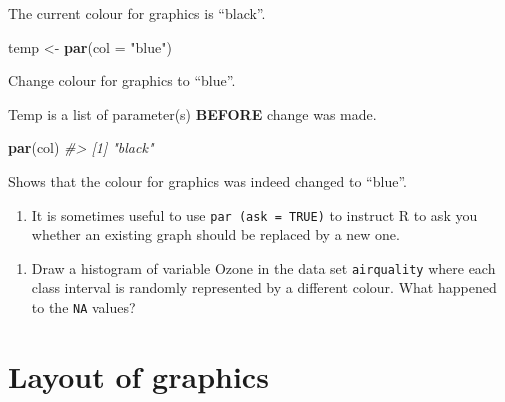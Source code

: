 \documentclass[
]{book}
\newenvironment{Shaded}{\begin{snugshade}}{\end{snugshade}}
\newcommand{\AttributeTok}[1]{\textcolor[rgb]{0.13,0.29,0.53}{#1}}
\newcommand{\CommentTok}[1]{\textcolor[rgb]{0.56,0.35,0.01}{\textit{#1}}}
\newcommand{\FunctionTok}[1]{\textcolor[rgb]{0.13,0.29,0.53}{\textbf{#1}}}
\newcommand{\NormalTok}[1]{#1}
\newcommand{\OtherTok}[1]{\textcolor[rgb]{0.56,0.35,0.01}{#1}}
\newcommand{\StringTok}[1]{\textcolor[rgb]{0.31,0.60,0.02}{#1}}
\providecommand{\tightlist}{%
  \setlength{\itemsep}{0pt}\setlength{\parskip}{0pt}}
\begin{document}
The current colour for graphics is ``black''.

\begin{Shaded}
\begin{Highlighting}[]
\NormalTok{temp }\OtherTok{\textless{}{-}} \FunctionTok{par}\NormalTok{(}\AttributeTok{col =} \StringTok{"blue"}\NormalTok{)}
\end{Highlighting}
\end{Shaded}

Change colour for graphics to ``blue''.

\begin{Shaded}
\end{Shaded}

Temp is a list of parameter(s) \textbf{BEFORE} change was made.

\begin{Shaded}
\begin{Highlighting}[]
\FunctionTok{par}\NormalTok{(}\StringTok{\textquotesingle{}col\textquotesingle{}}\NormalTok{)}
\CommentTok{\#\textgreater{} [1] "black"}
\end{Highlighting}
\end{Shaded}

Shows that the colour for graphics was indeed changed to ``blue''.

\begin{enumerate}
\def\labelenumi{(\alph{enumi})}
\setcounter{enumi}{4}
\tightlist
\item
  It is sometimes useful to use \texttt{par\ (ask\ =\ TRUE)} to instruct R to ask you whether an existing graph should be replaced by a new one.
\end{enumerate}

\begin{enumerate}
\def\labelenumi{(\alph{enumi})}
\setcounter{enumi}{5}
\tightlist
\item
  Draw a histogram of variable Ozone in the data set \texttt{airquality} where each class interval is randomly represented by a different colour. What happened to the \texttt{NA} values?
\end{enumerate}

\section{Layout of graphics}\label{layout-of-graphics}
\end{document}
